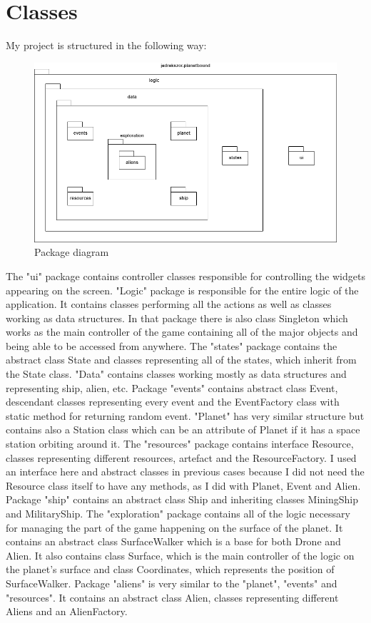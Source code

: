 \documentclass[a4paper,12pt]{article}
\begin{document}
\section{Classes}
My project is structured in the following way:
\begin{figure}[H]
	\caption{Package diagram}
	\includegraphics[scale=0.5]{PackageDiagram.png}
\end{figure}
The "ui" package contains controller classes responsible for controlling the widgets appearing on the screen. "Logic" package is responsible for the entire logic of the application. It contains classes performing all the actions as well as classes working as data structures. In that package there is also class Singleton which works as the main controller of the game containing all of the major objects and being able to be accessed from anywhere. The "states" package contains the abstract class State and classes representing all of the states, which inherit from the State class. "Data" contains classes working mostly as data structures and representing ship, alien, etc. Package "events" contains abstract class Event, descendant classes representing every event and the EventFactory class with static method for returning random event. "Planet" has very similar structure but contains also a Station class which can be an attribute of Planet if it has a space station orbiting around it. The "resources" package contains interface Resource, classes representing different resources, artefact and the ResourceFactory. I used an interface here and abstract classes in previous cases because I did not need the Resource class itself to have any methods, as I did with Planet, Event and Alien. Package "ship" contains an abstract class Ship and inheriting classes MiningShip and MilitaryShip. The "exploration" package contains all of the logic necessary for managing the part of the game happening on the surface of the planet. It contains an abstract class SurfaceWalker which is a base for both Drone and Alien. It also contains class Surface, which is the main controller of the logic on the planet's surface and class Coordinates, which represents the position of SurfaceWalker. Package "aliens" is very similar to the "planet", "events" and "resources". It contains an abstract class Alien, classes representing different Aliens and an AlienFactory.
\end{document}
